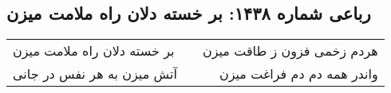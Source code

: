 \begin{center}
\section*{رباعی شماره ۱۴۳۸: بر خسته دلان راه ملامت میزن}
\label{sec:1438}
\begin{longtable}{l p{0.5cm} r}
بر خسته دلان راه ملامت میزن
&&
هردم زخمی فزون ز طاقت میزن
\\
آتش میزن به هر نفس در جانی
&&
واندر همه دم دم فراغت میزن
\\
\end{longtable}
\end{center}
